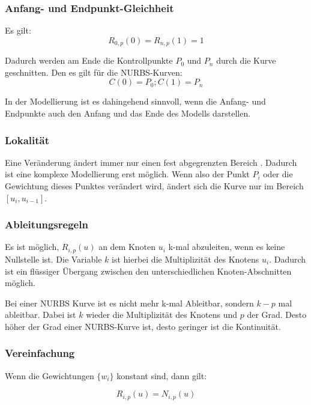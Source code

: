 \documentclass[11pt]{article}
\begin{document}
\subsubsection*{Anfang- und Endpunkt-Gleichheit}
Es gilt:
\begin{equation}
R_{0,p}(0) = R_{n,p}(1) = 1
\end{equation}

Dadurch werden am Ende die Kontrollpunkte $P_{0}$ und $P_{n}$ durch die Kurve geschnitten.
Den es gilt für die NURBS-Kurven:
\begin{equation}
C(0) = P_{0} ; C(1) = P_{n}
\end{equation}

In der Modellierung ist es dahingehend sinnvoll, wenn die Anfang- und Endpunkte auch den Anfang und das Ende des Modells darstellen.

\subsubsection*{Lokalität}
Eine Veränderung ändert immer nur einen fest abgegrenzten Bereich .
Dadurch ist eine komplexe Modellierung erst möglich.
Wenn also der Punkt $P_{i}$ oder die Gewichtung dieses Punktes verändert wird, ändert sich die Kurve nur im Bereich $[u_{i}, u_{i-1}]$.


\subsubsection*{Ableitungsregeln}
Es ist möglich, $R_{i,p}(u)$ an dem Knoten $u_{i}$ k-mal abzuleiten, wenn es keine Nullstelle ist.
Die Variable $k$ ist hierbei die Multiplizität des Knotens $u_{i}$.
Dadurch ist ein flüssiger Übergang zwischen den unterschiedlichen Knoten-Abschnitten möglich.

Bei einer NURBS Kurve ist es nicht mehr k-mal Ableitbar,  sondern $k-p$ mal ableitbar. 
Dabei ist $k$ wieder die Multiplizität des Knotens und $p$ der Grad.
Desto höher der Grad einer NURBS-Kurve ist, desto geringer ist die Kontinuität. 

\subsubsection*{Vereinfachung}
Wenn die Gewichtungen $\{w_{i}\}$ konstant sind, dann gilt:

\begin{equation}
R_{i,p}(u) = N_{i,p}(u)
\end{equation}
\end{document}
